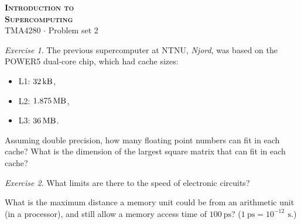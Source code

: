 \documentclass[onecolumn, oneside, a4paper, 11pt]{memoir}
\theoremstyle{remark}
\newtheorem{ex}{Exercise}
\begin{document}
\pagestyle{empty}

\begin{center}
  {\Huge \bfseries \scshape
    Introduction to \\[0.2\baselineskip] Supercomputing} \\[2\baselineskip]
  {\Large TMA4280 $\cdot$ Problem set 2} \\[2\baselineskip]
\end{center}

\begin{ex}
  The previous supercomputer at NTNU, \emph{Njord}, was based on the POWER5
  dual-core chip, which had cache sizes:
  \begin{itemize}
  \item L1: $\SI{32}{\kilo\byte}$,
  \item L2: $\SI{1.875}{\mega\byte}$,
  \item L3: $\SI{36}{\mega\byte}$.
  \end{itemize}
  Assuming double precision, how many floating point numbers can fit in each
  cache? What is the dimension of the largest square matrix that can fit in each
  cache?
\end{ex}

\begin{ex}
  What limits are there to the speed of electronic circuits?

  What is the maximum distance a memory unit could be from an arithmetic unit
  (in a processor), and still allow a memory access time of
  $\SI{100}{\pico\second}$? ($\SI{1}{\pico\second} = 10^{-12}\,\SI{}{\second}$.)
\end{ex}
\end{document}
